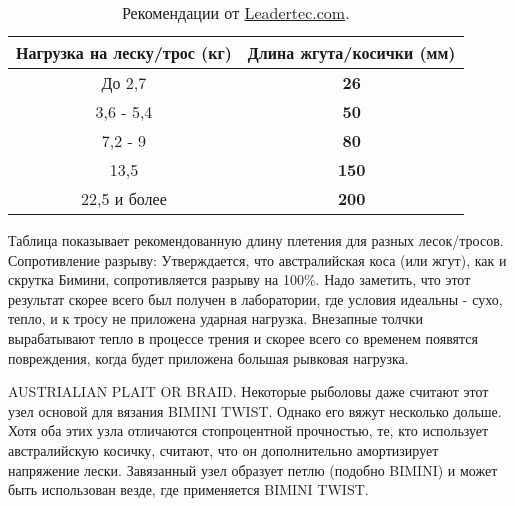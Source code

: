 \begin{table}[H]
\begin{center}
\begin{tabular}{ c|c }
\toprule %
Нагрузка на леску/трос (кг) & Длина жгута/косички (мм) \\
\midrule %
До 2,7 & \textbf{26} \\
3,6 - 5,4 & \textbf{50} \\
7,2 - 9 & \textbf{80} \\
13,5 & \textbf{150} \\
22,5 и более & \textbf{200} \\
\bottomrule %
\end{tabular}
\end{center}
\caption{Рекомендации от \href{http://www.leadertec.com}{Leadertec.com}.}
\label{tabl:Nagruzka_1}
\end{table}

Таблица показывает рекомендованную длину плетения для разных лесок/тросов. Сопротивление разрыву: Утверждается, что австралийская коса (или жгут), как и скрутка Бимини, сопротивляется разрыву на 100\%. Надо заметить, что этот результат скорее всего был получен в лаборатории, где условия идеальны - сухо, тепло, и к тросу не приложена ударная нагрузка. Внезапные толчки вырабатывают тепло в процессе трения и скорее всего со временем появятся повреждения, когда будет приложена большая рывковая нагрузка.

AUSTRIALIAN PLAIT OR BRAID. Некоторые рыболовы даже считают этот узел основой для вязания BIMINI TWIST. Однако его вяжут несколько дольше. Хотя оба этих узла отличаются стопроцентной прочностью, те, кто использует австралийскую косичку, считают, что он дополнительно амортизирует напряжение лески. Завязанный узел образует петлю (подобно BIMINI) и может быть использован везде, где применяется BIMINI TWIST.

